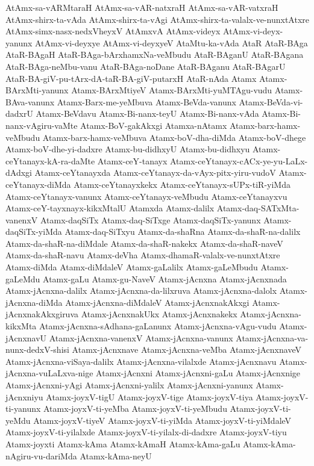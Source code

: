 {AtAmx-sa-vARMtaraH
AtAmx-sa-vAR-natxraH
AtAmx-sa-vAR-vatxraH
AtAmx-shirx-ta-vAda
AtAmx-shirx-ta-vAgi
AtAmx-shirx-ta-valalx-ve-nunxtAtxre
AtAmx-simx-nasx-nedxVheyxV
AtAmxvA
AtAmx-videyx
AtAmx-vi-deyx-yanunx
AtAmx-vi-deyxye
AtAmx-vi-deyxyeV
AtaMtu-ka-vAda
AtaR
AtaR-BAga
AtaR-BAgaH
AtaR-BAga-bArxhamxNa-veMbudu
AtaR-BAganU
AtaR-BAgana
AtaR-BAga-neMbu-vanu
AtaR-BAga-noDane
AtaR-BAganu
AtaR-BAgarU
AtaR-BA-giV-pu-tArx-dA-taR-BA-giV-putarxH
AtaR-nAda
Atamx
Atamx-BArxMti-yanunx
Atamx-BArxMtiyeV
Atamx-BArxMti-yuMTAgu-vudu
Atamx-BAva-vanunx
Atamx-Barx-me-yeMbuva
Atamx-BeVda-vanunx
Atamx-BeVda-vi-dadxrU
Atamx-BeVdavu
Atamx-Bi-nanx-teyU
Atamx-Bi-nanx-vAda
Atamx-Bi-nanx-vAgiru-vaMte
Atamx-BoV-gakAkxgi
Atamxa-nAtamx
Atamx-barx-hamx-veMbudu
Atamx-barx-hamx-veMbuva
Atamx-boV-dha-diMda
Atamx-boV-dhege
Atamx-boV-dhe-yi-dadxre
Atamx-bu-didhxyU
Atamx-bu-didhxyu
Atamx-ceYtanayx-kA-ra-daMte
Atamx-ceY-tanayx
Atamx-ceYtanayx-cACx-ye-yu-LaLx-dAdxgi
Atamx-ceYtanayxda
Atamx-ceYtanayx-da-vAyx-pitx-yiru-vudoV
Atamx-ceYtanayx-diMda
Atamx-ceYtanayxkekx
Atamx-ceYtanayx-sUPx-tiR-yiMda
Atamx-ceYtanayx-vanunx
Atamx-ceYtanayx-veMbudu
Atamx-ceYtanayxvu
Atamx-ceY-tayxnayx-kikxMtalU
Atamxda
Atamx-dalilx
Atamx-daq-SATxMta-vanenxV
Atamx-daqSiTx
Atamx-daq-SiTxge
Atamx-daqSiTx-yanunx
Atamx-daqSiTx-yiMda
Atamx-daq-SiTxyu
Atamx-da-shaRna
Atamx-da-shaR-na-dalilx
Atamx-da-shaR-na-diMdale
Atamx-da-shaR-nakekx
Atamx-da-shaR-naveV
Atamx-da-shaR-navu
Atamx-deVha
Atamx-dhamaR-valalx-ve-nunxtAtxre
Atamx-diMda
Atamx-diMdaleV
Atamx-gaLalilx
Atamx-gaLeMbudu
Atamx-gaLeMdu
Atamx-gaLu
Atamx-gu-NaveV
Atamx-jAcnxna
Atamx-jAcnxnada
Atamx-jAcnxna-dalilx
Atamx-jAcnxna-da-lilxruva
Atamx-jAcnxna-dalolx
Atamx-jAcnxna-diMda
Atamx-jAcnxna-diMdaleV
Atamx-jAcnxnakAkxgi
Atamx-jAcnxnakAkxgiruva
Atamx-jAcnxnakUkx
Atamx-jAcnxnakekx
Atamx-jAcnxna-kikxMta
Atamx-jAcnxna-sAdhana-gaLanunx
Atamx-jAcnxna-vAgu-vudu
Atamx-jAcnxnavU
Atamx-jAcnxna-vanenxV
Atamx-jAcnxna-vanunx
Atamx-jAcnxna-va-nunx-dedxV-shisi
Atamx-jAcnxnave
Atamx-jAcnxna-veMba
Atamx-jAcnxnaveV
Atamx-jAcnxna-viSaya-dalilx
Atamx-jAcnxna-vilalxde
Atamx-jAcnxnavu
Atamx-jAcnxna-vuLaLxva-nige
Atamx-jAcnxni
Atamx-jAcnxni-gaLu
Atamx-jAcnxnige
Atamx-jAcnxni-yAgi
Atamx-jAcnxni-yalilx
Atamx-jAcnxni-yanunx
Atamx-jAcnxniyu
Atamx-joyxV-tigU
Atamx-joyxV-tige
Atamx-joyxV-tiya
Atamx-joyxV-ti-yanunx
Atamx-joyxV-ti-yeMba
Atamx-joyxV-ti-yeMbudu
Atamx-joyxV-ti-yeMdu
Atamx-joyxV-tiyeV
Atamx-joyxV-ti-yiMda
Atamx-joyxV-ti-yiMdaleV
Atamx-joyxV-ti-yilalxde
Atamx-joyxV-ti-yilalx-di-dadxre
Atamx-joyxV-tiyu
Atamx-joyxti
Atamx-kAma
Atamx-kAmaH
Atamx-kAma-gaLu
Atamx-kAma-nAgiru-vu-dariMda
Atamx-kAma-neyU
}
